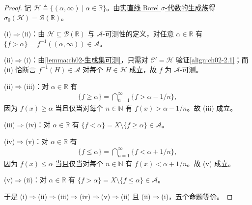 \documentclass[../../main.tex]{subfiles}%
\begin{document}
\begin{proof}
记 $\mathscr H\triangleq\{(\alpha,\infty)\mid\alpha\in\mathbb{R}\}$。由\hyperref[remark:ch01-实直线Borel]{实直线 Borel $\sigma$-代数的生成族}得 $\sigma_0(\mathscr H)=\mathscr B(\mathbb{R})$。

(i)$\Rightarrow$(ii)：由 $\mathscr H\subseteq\mathscr B(\mathbb{R})$ 与 $\mathscr A$-可测性的定义，对任意 $\alpha\in\mathbb{R}$ 有 $\{f>\alpha\}=f^{-1}((\alpha,\infty))\in\mathscr A$。

(ii)$\Rightarrow$(i)：由\cref{lemma:ch02-生成集可测}，只需对 $\mathscr C'=\mathscr H$ 验证\eqref{align:ch02-2.1}；而 (ii) 恰断言 $f^{-1}(H)\in\mathscr A$ 对每个 $H\in\mathscr H$ 成立，故 $f$ 为 $\mathscr A$-可测。

(ii)$\Rightarrow$(iii)：对 $\alpha\in\mathbb{R}$ 有
\begin{align*}
\{f\geqslant\alpha\}=\bigcap_{n=1}^\infty\{f>\alpha-1/n\},
\end{align*}
因为 $f(x)\geqslant\alpha$ 当且仅当对每个 $n\in\mathbb{N}$ 有 $f(x)>\alpha-1/n$。故 (iii) 成立。

(iii)$\Rightarrow$(iv)：对 $\alpha\in\mathbb{R}$ 有 $\{f<\alpha\}=X\setminus\{f\geqslant\alpha\}\in\mathscr A$。

(iv)$\Rightarrow$(v)：对 $\alpha\in\mathbb{R}$ 有
\begin{align*}
\{f\leqslant\alpha\}=\bigcap_{n=1}^\infty\{f<\alpha+1/n\},
\end{align*}
因为 $f(x)\leqslant\alpha$ 当且仅当对每个 $n\in\mathbb{N}$ 有 $f(x)<\alpha+1/n$。故 (v) 成立。

(v)$\Rightarrow$(ii)：对 $\alpha\in\mathbb{R}$ 有 $\{f>\alpha\}=X\setminus\{f\leqslant\alpha\}\in\mathscr A$。

于是 (i)$\Rightarrow$(ii)$\Rightarrow$(iii)$\Rightarrow$(iv)$\Rightarrow$(v)$\Rightarrow$(ii) 且 (ii)$\Rightarrow$(i)，五个命题等价。
\end{proof}
\end{document}
